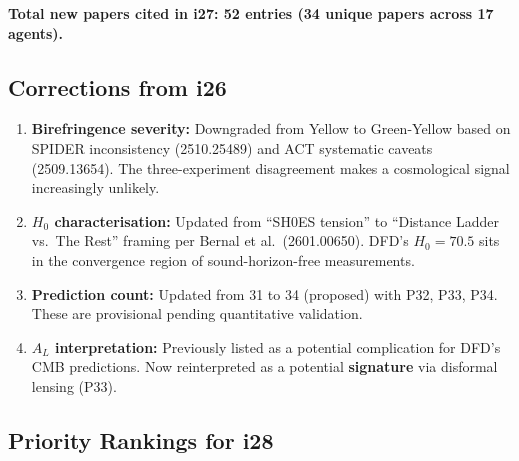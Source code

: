 \documentclass[11pt,a4paper]{article}
\begin{document}
\textbf{Total new papers cited in i27: 52 entries (34 unique papers across 17 agents).}

\subsection{Corrections from i26}

\begin{enumerate}
\item \textbf{Birefringence severity:} Downgraded from Yellow to Green-Yellow based on SPIDER inconsistency (2510.25489) and ACT systematic caveats (2509.13654). The three-experiment disagreement makes a cosmological signal increasingly unlikely.

\item \textbf{$H_0$ characterisation:} Updated from ``SH0ES tension'' to ``Distance Ladder vs.\ The Rest'' framing per Bernal et al.\ (2601.00650). DFD's $H_0 = 70.5$ sits in the convergence region of sound-horizon-free measurements.

\item \textbf{Prediction count:} Updated from 31 to 34 (proposed) with P32, P33, P34. These are provisional pending quantitative validation.

\item \textbf{$A_L$ interpretation:} Previously listed as a potential complication for DFD's CMB predictions. Now reinterpreted as a potential \textbf{signature} via disformal lensing (P33).
\end{enumerate}

\subsection{Priority Rankings for i28}
\end{document}

